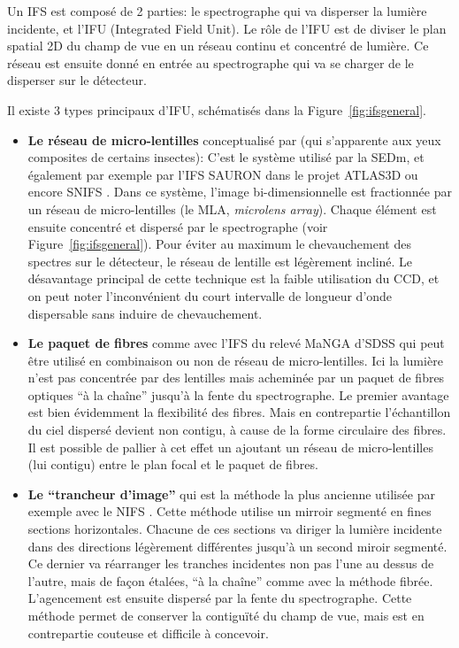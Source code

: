 \documentclass[../main/main.tex]{subfiles}
\begin{document}
Un IFS est composé de 2 parties: le spectrographe qui va disperser la
lumière incidente, et l'IFU (Integrated Field Unit). Le rôle de l'IFU
est de diviser le plan spatial 2D du champ de vue en un réseau continu
et concentré de lumière. Ce réseau est ensuite donné en entrée au
spectrographe qui va se charger de le disperser sur le détecteur.

Il existe 3 types principaux d'IFU, schématisés dans la Figure~\ref{fig:ifsgeneral}.
\begin{itemize}[label=$\bullet$]
\itemsep0em 
\item \textbf{Le réseau de micro-lentilles} conceptualisé par
  \citet{BaconIFUlens} (qui s'apparente aux yeux composites
  de certains insectes): C'est le système utilisé par la SEDm, et
  également par exemple par l'IFS SAURON \citep{SAURONifs} dans le projet ATLAS3D
  \citep{ATLAS3D} ou encore SNIFS \citep{SNIFS2004}. Dans ce système,
  l'image bi-dimensionnelle est fractionnée par un réseau de
  micro-lentilles (le MLA, \textit{microlens array}). Chaque élément est ensuite
  concentré et dispersé par le spectrographe (voir
  Figure~\ref{fig:ifsgeneral}). Pour éviter au maximum le chevauchement des
  spectres sur le détecteur, le réseau de lentille est légèrement
  incliné. Le désavantage principal de cette technique est la
  faible utilisation du CCD, et on peut noter l'inconvénient du court
  intervalle de longueur d'onde dispersable sans induire de chevauchement.
  
\item \textbf{Le paquet de fibres} comme
  avec l'IFS du relevé MaNGA d'SDSS \citep{SDSSIFS} qui peut
  être utilisé en combinaison \citep{BardenIFUfiber} ou non
  \citep{allingtonIFUlensfiber} de réseau de micro-lentilles.
  Ici la lumière n'est pas concentrée par des lentilles mais acheminée
  par un paquet de fibres optiques ``à la chaîne'' jusqu'à la fente du spectrographe. Le
  premier avantage est bien évidemment la flexibilité des fibres. Mais
  en contrepartie l'échantillon du ciel dispersé devient non contigu, à
  cause de la forme circulaire des fibres. Il est possible de pallier à
  cet effet un ajoutant un réseau de micro-lentilles (lui contigu) entre
  le plan focal et le paquet de fibres.  
  
\item \textbf{Le ``trancheur d'image''} qui est la méthode la plus
  ancienne \citep{BowenIFUslicer,ContentIFUslicer} utilisée
  par exemple avec le NIFS
   \citep[\textit{near-infrared integral field spectrograph},][]{GeminiNIFS}. Cette
  méthode utilise un mirroir segmenté en fines sections
  horizontales. Chacune de ces sections va diriger la lumière incidente
  dans des directions légèrement différentes jusqu'à un second miroir
  segmenté. Ce dernier va réarranger les tranches incidentes non pas
  l'une au dessus de l'autre, mais de façon étalées, ``à la chaîne''
  comme avec la méthode fibrée. L'agencement est ensuite dispersé par la
  fente du spectrographe. Cette méthode permet de conserver la
  contiguïté du champ de vue, mais est en contrepartie couteuse et
  difficile à concevoir.
\end{itemize}
\end{document}
